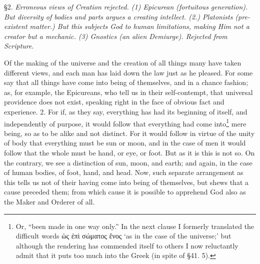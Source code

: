 
§2. \emph{Erroneous views of Creation rejected. (1) Epicurean (fortuitous generation). But diversity of bodies and parts argues a creating intellect. (2.) Platonists (pre-existent matter.) But this subjects God to human limitations, making Him not a creator but a mechanic. (3) Gnostics (an alien Demiurge). Rejected from Scripture}.

Of the making of the universe and the creation of all things many have taken different views, and each man has laid down the law just as he pleased. For some say that all things have come into being of themselves, and in a chance fashion; as, for example, the Epicureans, who tell us in their self-contempt, that universal providence does not exist, speaking right in the face of obvious fact and experience. 2. For if, as they say, everything has had its beginning of itself, and independently of purpose, it would follow that everything had come into\footnote{Or, “been made in one way only.” In the next clause I formerly translated the difficult words \textgreek{ὡς ἐπὶ σώματος ἕνος} ‘as in the case of the universe;’ but although the rendering has commended itself to others I now reluctantly admit that it puts too much into the Greek (in spite of §41. 5).} mere being, so as to be alike and not distinct. For it would follow in virtue of the unity of body that everything must be sun or moon, and in the case of men it would follow that the whole must be hand, or eye, or foot. But as it is this is not so. On the contrary, we see a distinction of sun, moon, and earth; and again, in the case of human bodies, of foot, hand, and head. Now, such separate arrangement as this tells us not of their having come into being of themselves, but shews that a cause preceded them; from which cause it is possible to apprehend God also as the Maker and Orderer of all.

